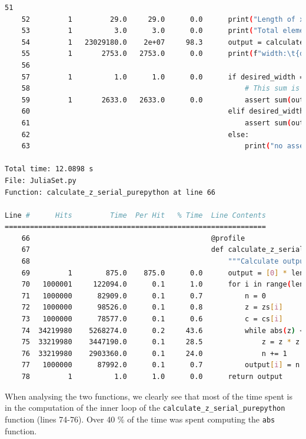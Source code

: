 \documentclass[a4paper,12pt]{article}
\begin{document}
\begin{lstlisting}[language=bash,basicstyle=\tiny\ttfamily]
    51
    52         1         29.0     29.0      0.0      print("Length of x:", len(x))
    53         1          3.0      3.0      0.0      print("Total elements:", len(zs))
    54         1   23029180.0    2e+07     98.3      output = calculate_z_serial_purepython(max_iterations, zs, cs)
    55         1       2753.0   2753.0      0.0      print(f"width:\t{desired_width}\noutput:\t{sum(output)}")
    56
    57         1          1.0      1.0      0.0      if desired_width == 1000:
    58                                                   # This sum is expected for a 1000^2 grid with 300 iterations
    59         1       2633.0   2633.0      0.0          assert sum(output) == 33219980
    60                                               elif desired_width == 10000:
    61                                                   assert sum(output) == 3323787446
    62                                               else:
    63                                                   print("no asserts for this dimension...")

Total time: 12.0898 s
File: JuliaSet.py
Function: calculate_z_serial_purepython at line 66

Line #      Hits         Time  Per Hit   % Time  Line Contents
==============================================================
    66                                           @profile
    67                                           def calculate_z_serial_purepython(maxiter, zs, cs):
    68                                               """Calculate output list using Julia update rule"""
    69         1        875.0    875.0      0.0      output = [0] * len(zs)
    70   1000001     122094.0      0.1      1.0      for i in range(len(zs)):
    71   1000000      82909.0      0.1      0.7          n = 0
    72   1000000      98526.0      0.1      0.8          z = zs[i]
    73   1000000      78577.0      0.1      0.6          c = cs[i]
    74  34219980    5268274.0      0.2     43.6          while abs(z) < 2 and n < maxiter:
    75  33219980    3447190.0      0.1     28.5              z = z * z + c
    76  33219980    2903360.0      0.1     24.0              n += 1
    77   1000000      87992.0      0.1      0.7          output[i] = n
    78         1          1.0      1.0      0.0      return output
\end{lstlisting}

When analysing the two functions, we clearly see that most of the time spent is in the computation of the inner loop of the  \verb|calculate_z_serial_purepython| function (lines 74-76).
Over 40 \% of the time was spent computing the \verb|abs| function.
\end{document}
